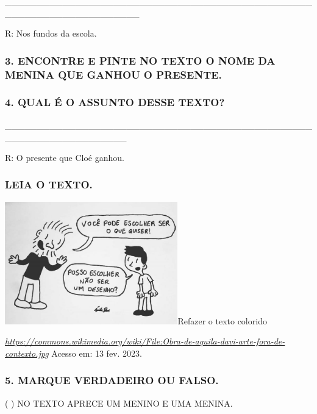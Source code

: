 \_\_\_\_\_\_\_\_\_\_\_\_\_\_\_\_\_\_\_\_\_\_\_\_\_\_\_\_\_\_\_\_\_\_\_\_\_\_\_\_\_\_\_\_\_\_\_\_\_\_\_\_\_\_\_\_\_\_\_\_\_\_\_\_\_\_\_\_\_

R: Nos fundos da escola.

\subsubsection{3. ENCONTRE E PINTE NO TEXTO O NOME DA MENINA QUE GANHOU O
PRESENTE.}\label{encontre-e-pinte-no-texo-o-nome-da-menina-que-ganhou-o-presente.}

\subsubsection{4. QUAL É O ASSUNTO DESSE TEXTO?}\label{qual-uxe9-o-assunto-desse-texto}

\_\_\_\_\_\_\_\_\_\_\_\_\_\_\_\_\_\_\_\_\_\_\_\_\_\_\_\_\_\_\_\_\_\_\_\_\_\_\_\_\_\_\_\_\_\_\_\_\_\_\_\_\_\_\_\_\_\_\_\_\_\_\_\_\_\_\_

R: O presente que Cloé ganhou.

\subsubsection{LEIA O TEXTO.}\label{leia-o-texto.-1}

\includegraphics[width=2.95254in,height=2.09138in]{media/image164.jpg}Refazer
o texto colorido

\href{https://commons.wikimedia.org/wiki/File:Obra-de-aquila-davi-arte-fora-de-contexto.jpg}{\emph{https://commons.wikimedia.org/wiki/File:Obra-de-aquila-davi-arte-fora-de-contexto.jpg}}
Acesso em: 13 fev. 2023.

\subsubsection{5. MARQUE VERDADEIRO OU
FALSO.}\label{marque-verdadeiro-ou-falso.}

( ) NO TEXTO APRECE UM MENINO E UMA MENINA.

